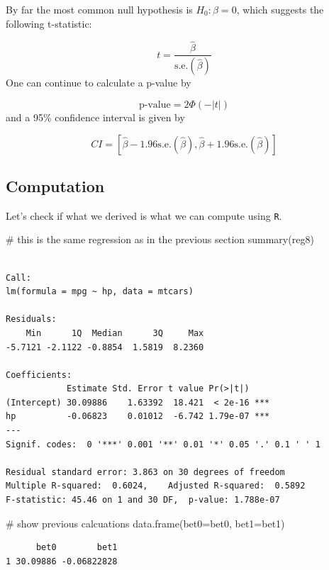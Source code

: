 \documentclass[
  letterpaper,
  DIV=11,
  numbers=noendperiod]{scrreprt}
\newenvironment{Shaded}{\begin{snugshade}}{\end{snugshade}}
\newcommand{\AttributeTok}[1]{\textcolor[rgb]{0.40,0.45,0.13}{#1}}
\newcommand{\CommentTok}[1]{\textcolor[rgb]{0.37,0.37,0.37}{#1}}
\newcommand{\FunctionTok}[1]{\textcolor[rgb]{0.28,0.35,0.67}{#1}}
\newcommand{\NormalTok}[1]{\textcolor[rgb]{0.00,0.23,0.31}{#1}}
\begin{document}
By far the most common null hypothesis is \(H_0: \beta = 0\), which
suggests the following t-statistic:

\[
  t = \frac{\hat{\beta}}{\textrm{s.e.}(\hat{\beta})}
\] One can continue to calculate a p-value by

\[
  \textrm{p-value} = 2 \Phi(-|t|)
\] and a 95\% confidence interval is given by

\[
  CI = [\hat{\beta} - 1.96 \textrm{s.e.}(\hat{\beta}), \hat{\beta} + 1.96 \textrm{s.e.}(\hat{\beta})]
\]

\subsection{Computation}\label{computation-8}

Let's check if what we derived is what we can compute using \texttt{R}.

\begin{Shaded}
\begin{Highlighting}[]
\CommentTok{\# this is the same regression as in the previous section}
\FunctionTok{summary}\NormalTok{(reg8)}
\end{Highlighting}
\end{Shaded}

\begin{verbatim}

Call:
lm(formula = mpg ~ hp, data = mtcars)

Residuals:
    Min      1Q  Median      3Q     Max 
-5.7121 -2.1122 -0.8854  1.5819  8.2360 

Coefficients:
            Estimate Std. Error t value Pr(>|t|)    
(Intercept) 30.09886    1.63392  18.421  < 2e-16 ***
hp          -0.06823    0.01012  -6.742 1.79e-07 ***
---
Signif. codes:  0 '***' 0.001 '**' 0.01 '*' 0.05 '.' 0.1 ' ' 1

Residual standard error: 3.863 on 30 degrees of freedom
Multiple R-squared:  0.6024,    Adjusted R-squared:  0.5892 
F-statistic: 45.46 on 1 and 30 DF,  p-value: 1.788e-07
\end{verbatim}

\begin{Shaded}
\begin{Highlighting}[]
\CommentTok{\# show previous calcuations}
\FunctionTok{data.frame}\NormalTok{(}\AttributeTok{bet0=}\NormalTok{bet0, }\AttributeTok{bet1=}\NormalTok{bet1)}
\end{Highlighting}
\end{Shaded}

\begin{verbatim}
      bet0        bet1
1 30.09886 -0.06822828
\end{verbatim}
\end{document}
